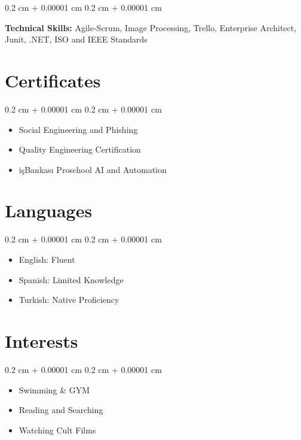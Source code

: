 \documentclass[10pt, letterpaper]{article}
\newenvironment{highlights}{
    \begin{itemize}[
        topsep=0.10 cm,
        parsep=0.10 cm,
        partopsep=0pt,
        itemsep=0pt,
        leftmargin=0.4 cm + 10pt
    ]
}{
    \end{itemize}
}
\newenvironment{onecolentry}{
    \begin{adjustwidth}{
        0.2 cm + 0.00001 cm
    }{
        0.2 cm + 0.00001 cm
    }
}{
    \end{adjustwidth}
}
\begin{document}
    \vspace{0.2 cm}

    \begin{onecolentry}
        \textbf{Technical Skills:} Agile-Scrum, Image Processing, Trello, Enterprise Architect, Junit, .NET, ISO and IEEE Standards
    \end{onecolentry}

    \section{Certificates}

    \begin{onecolentry}
        \begin{highlights}
            \item Social Engineering and Phishing
            \item Quality Engineering Certification
            \item işBankası Proschool AI and Automation
        \end{highlights}
    \end{onecolentry}

    \section{Languages}

    \begin{onecolentry}
        \begin{highlights}
            \item English: Fluent
            \item Spanish: Limited Knowledge
            \item Turkish: Native Proficiency
        \end{highlights}
    \end{onecolentry}

    \section{Interests}

    \begin{onecolentry}
        \begin{highlights}
            \item Swimming & GYM
            \item Reading and Searching
            \item Watching Cult Films
        \end{highlights}
    \end{onecolentry}
\end{document}
